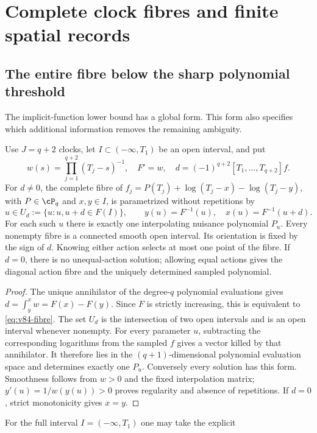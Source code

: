 \section{Complete clock fibres and finite spatial records}
\label{sec:v84-finite}
\subsection{The entire fibre below the sharp polynomial threshold}
The implicit-function lower bound has a global form. This form also
specifies which additional information removes the remaining ambiguity.

\begin{theorem}\label{thm:v84-fibre}
Use $J=q+2$ clocks, let $I\subset(-\infty,T_1)$ be an open interval,
and put
\[
 w(s)=\prod_{j=1}^{q+2}(T_j-s)^{-1},\quad F'=w,\quad
 d=(-1)^{q+2}[T_1,\ldots,T_{q+2}]f.
\]
For $d\ne0$, the complete fibre of
$f_j=P(T_j)+\log(T_j-x)-\log(T_j-y)$, with $P\in\cP_q$ and
$x,y\in I$, is parametrized without repetitions by
\begin{equation}\label{eq:v84-fibre}
 u\in U_d:=\{u:u,u+d\in F(I)\},\qquad
 y(u)=F^{-1}(u),\quad x(u)=F^{-1}(u+d).
\end{equation}
For each such $u$ there is exactly one interpolating nuisance polynomial
$P_u$. Every nonempty fibre is a connected smooth open interval. Its
orientation is fixed by the sign of $d$. Knowing either action selects
at most one point of the fibre. If $d=0$, there is no unequal-action
solution; allowing equal actions gives the diagonal action fibre and
the uniquely determined sampled polynomial.
\end{theorem}
\begin{proof}
The unique annihilator of the degree-$q$ polynomial evaluations gives
$d=\int_y^xw=F(x)-F(y)$. Since $F$ is strictly increasing, this is
equivalent to \eqref{eq:v84-fibre}. The set $U_d$ is the intersection
of two open intervals and is an open interval whenever nonempty.
For every parameter $u$, subtracting the corresponding logarithms
from the sampled $f$ gives a vector killed by that annihilator. It
therefore lies in the $(q+1)$-dimensional polynomial evaluation space
and determines exactly one $P_u$. Conversely every solution has this
form. Smoothness follows from $w>0$ and the fixed interpolation matrix;
$y'(u)=1/w(y(u))>0$ proves regularity and absence of repetitions.
If $d=0$, strict monotonicity gives $x=y$.
\end{proof}
For the full interval $I=(-\infty,T_1)$ one may take the explicit
